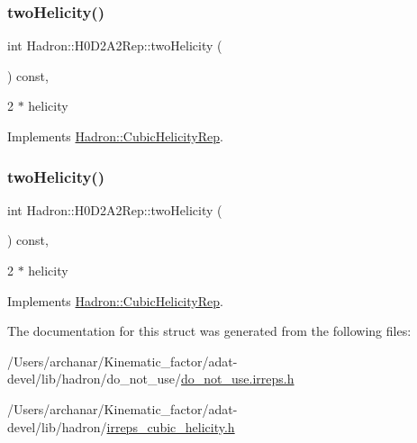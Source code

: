 \subsubsection{\texorpdfstring{twoHelicity()}{twoHelicity()}\hspace{0.1cm}{\footnotesize\ttfamily [2/3]}}
{\footnotesize\ttfamily int Hadron\+::\+H0\+D2\+A2\+Rep\+::two\+Helicity (\begin{DoxyParamCaption}{ }\end{DoxyParamCaption}) const\hspace{0.3cm}{\ttfamily [inline]}, {\ttfamily [virtual]}}

2 $\ast$ helicity 

Implements \mbox{\hyperlink{structHadron_1_1CubicHelicityRep_af507aa56fc2747eacc8cb6c96db31ecc}{Hadron\+::\+Cubic\+Helicity\+Rep}}.

\mbox{\label{structHadron_1_1H0D2A2Rep_ac561e7d1621438c3f64d1d13a2f62098}} 
\subsubsection{\texorpdfstring{twoHelicity()}{twoHelicity()}\hspace{0.1cm}{\footnotesize\ttfamily [3/3]}}
{\footnotesize\ttfamily int Hadron\+::\+H0\+D2\+A2\+Rep\+::two\+Helicity (\begin{DoxyParamCaption}{ }\end{DoxyParamCaption}) const\hspace{0.3cm}{\ttfamily [inline]}, {\ttfamily [virtual]}}

2 $\ast$ helicity 

Implements \mbox{\hyperlink{structHadron_1_1CubicHelicityRep_af507aa56fc2747eacc8cb6c96db31ecc}{Hadron\+::\+Cubic\+Helicity\+Rep}}.



The documentation for this struct was generated from the following files\+:\begin{DoxyCompactItemize}
\item 
/\+Users/archanar/\+Kinematic\+\_\+factor/adat-\/devel/lib/hadron/do\+\_\+not\+\_\+use/\mbox{\hyperlink{adat-devel_2lib_2hadron_2do__not__use_2do__not__use_8irreps_8h}{do\+\_\+not\+\_\+use.\+irreps.\+h}}\item 
/\+Users/archanar/\+Kinematic\+\_\+factor/adat-\/devel/lib/hadron/\mbox{\hyperlink{adat-devel_2lib_2hadron_2irreps__cubic__helicity_8h}{irreps\+\_\+cubic\+\_\+helicity.\+h}}\end{DoxyCompactItemize}
